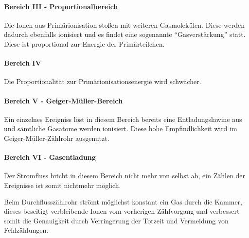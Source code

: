 \paragraph{Bereich III - Proportionalbereich} Die Ionen aus Primärionisation stoßen mit weiteren Gasmolekülen. Diese werden dadurch ebenfalls ionisiert und es findet eine sogenannte "`Gasverstärkung"' statt. Diese ist proportional zur Energie der Primärteilchen.
\paragraph{Bereich IV} Die Proportionalität zur Primärionisationsenergie wird schwächer.
\paragraph{Bereich V - Geiger-Müller-Bereich} Ein einzelnes Ereigniss löst in diesem Bereich bereits eine Entladungslawine aus und sämtliche Gasatome werden ionisiert. Diese hohe Empfindlichkeit wird im Geiger-Müller-Zählrohr ausgenutzt. 
\paragraph{Bereich VI - Gasentladung} Der Stromfluss bricht in diesem Bereich nicht mehr von selbst ab, ein Zählen der Ereignisse ist somit nichtmehr möglich.

Beim Durchflusszählrohr strömt möglichst konstant ein Gas durch die Kammer, dieses beseitigt verbleibende Ionen vom vorherigen Zählvorgang und verbessert somit die Genauigkeit durch Verringerung der Totzeit und Vermeidung von Fehlzählungen.


























